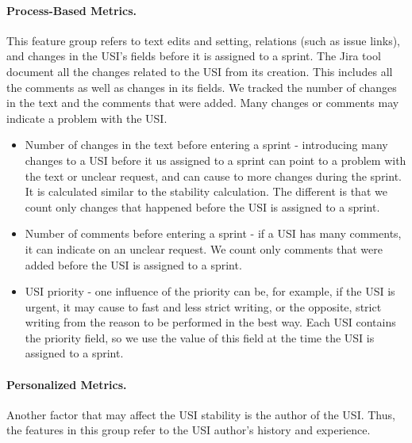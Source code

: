 \paragraph{\textbf{Process-Based Metrics.}}
    
This feature group refers to text edits and setting, relations (such as issue links), and changes in the USI's fields before it is assigned to a sprint. The Jira tool document all the changes related to the USI from its creation. This includes all the comments as well as changes in its fields. We tracked the number of changes in the text and the comments that were added. Many changes or comments may indicate a problem with the USI. 

\begin{itemize}
    \item Number of changes in the text before entering a sprint - introducing many changes to a USI before it us assigned to a sprint can point to a problem with the text or unclear request, and can cause to more changes during the sprint. It is calculated similar to the stability calculation. The different is that we count only changes that happened before the USI is assigned to a sprint.
    \item Number of comments before entering a sprint - if a USI has many comments, it can indicate on an unclear request. We count only comments that were added before the USI is assigned to a sprint.
    \item USI priority - one influence of the priority can be, for example, if the USI is urgent, it may cause to fast and less strict writing, or the opposite, strict writing from the reason to be performed in the best way. Each USI contains the priority field, so we use the value of this field at the time the USI is assigned to a sprint.
\end{itemize}
    
\paragraph{\textbf{Personalized Metrics.}}  
Another factor that may affect the USI stability is the author of the USI. Thus, the features in this group refer to the USI author’s history and experience. 

